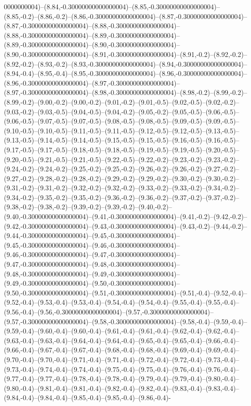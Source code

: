 0000000004)--(8.84,-0.30000000000000004)--(8.85,-0.30000000000000004)--(8.85,-0.2)--(8.86,-0.2)--(8.86,-0.30000000000000004)--(8.87,-0.30000000000000004)--(8.87,-0.30000000000000004)--(8.88,-0.30000000000000004)--(8.88,-0.30000000000000004)--(8.89,-0.30000000000000004)--(8.89,-0.30000000000000004)--(8.90,-0.30000000000000004)--(8.90,-0.30000000000000004)--(8.91,-0.30000000000000004)--(8.91,-0.2)--(8.92,-0.2)--(8.92,-0.2)--(8.93,-0.2)--(8.93,-0.30000000000000004)--(8.94,-0.30000000000000004)--(8.94,-0.4)--(8.95,-0.4)--(8.95,-0.30000000000000004)--(8.96,-0.30000000000000004)--(8.96,-0.30000000000000004)--(8.97,-0.30000000000000004)--(8.97,-0.30000000000000004)--(8.98,-0.30000000000000004)--(8.98,-0.2)--(8.99,-0.2)--(8.99,-0.2)--(9.00,-0.2)--(9.00,-0.2)--(9.01,-0.2)--(9.01,-0.5)--(9.02,-0.5)--(9.02,-0.2)--(9.03,-0.2)--(9.03,-0.5)--(9.04,-0.5)--(9.04,-0.2)--(9.05,-0.2)--(9.05,-0.5)--(9.06,-0.5)--(9.06,-0.5)--(9.07,-0.5)--(9.07,-0.5)--(9.08,-0.5)--(9.08,-0.5)--(9.09,-0.5)--(9.09,-0.5)--(9.10,-0.5)--(9.10,-0.5)--(9.11,-0.5)--(9.11,-0.5)--(9.12,-0.5)--(9.12,-0.5)--(9.13,-0.5)--(9.13,-0.5)--(9.14,-0.5)--(9.14,-0.5)--(9.15,-0.5)--(9.15,-0.5)--(9.16,-0.5)--(9.16,-0.5)--(9.17,-0.5)--(9.17,-0.5)--(9.18,-0.5)--(9.18,-0.5)--(9.19,-0.5)--(9.19,-0.5)--(9.20,-0.5)--(9.20,-0.5)--(9.21,-0.5)--(9.21,-0.5)--(9.22,-0.5)--(9.22,-0.2)--(9.23,-0.2)--(9.23,-0.2)--(9.24,-0.2)--(9.24,-0.2)--(9.25,-0.2)--(9.25,-0.2)--(9.26,-0.2)--(9.26,-0.2)--(9.27,-0.2)--(9.27,-0.2)--(9.28,-0.2)--(9.28,-0.2)--(9.29,-0.2)--(9.29,-0.2)--(9.30,-0.2)--(9.30,-0.2)--(9.31,-0.2)--(9.31,-0.2)--(9.32,-0.2)--(9.32,-0.2)--(9.33,-0.2)--(9.33,-0.2)--(9.34,-0.2)--(9.34,-0.2)--(9.35,-0.2)--(9.35,-0.2)--(9.36,-0.2)--(9.36,-0.2)--(9.37,-0.2)--(9.37,-0.2)--(9.38,-0.2)--(9.38,-0.2)--(9.39,-0.2)--(9.39,-0.2)--(9.40,-0.2)--(9.40,-0.30000000000000004)--(9.41,-0.30000000000000004)--(9.41,-0.2)--(9.42,-0.2)--(9.42,-0.30000000000000004)--(9.43,-0.30000000000000004)--(9.43,-0.2)--(9.44,-0.2)--(9.44,-0.30000000000000004)--(9.45,-0.30000000000000004)--(9.45,-0.30000000000000004)--(9.46,-0.30000000000000004)--(9.46,-0.30000000000000004)--(9.47,-0.30000000000000004)--(9.47,-0.30000000000000004)--(9.48,-0.30000000000000004)--(9.48,-0.30000000000000004)--(9.49,-0.30000000000000004)--(9.49,-0.30000000000000004)--(9.50,-0.30000000000000004)--(9.50,-0.30000000000000004)--(9.51,-0.30000000000000004)--(9.51,-0.4)--(9.52,-0.4)--(9.52,-0.4)--(9.53,-0.4)--(9.53,-0.4)--(9.54,-0.4)--(9.54,-0.4)--(9.55,-0.4)--(9.55,-0.4)--(9.56,-0.4)--(9.56,-0.30000000000000004)--(9.57,-0.30000000000000004)--(9.57,-0.30000000000000004)--(9.58,-0.30000000000000004)--(9.58,-0.4)--(9.59,-0.4)--(9.59,-0.4)--(9.60,-0.4)--(9.60,-0.4)--(9.61,-0.4)--(9.61,-0.4)--(9.62,-0.4)--(9.62,-0.4)--(9.63,-0.4)--(9.63,-0.4)--(9.64,-0.4)--(9.64,-0.4)--(9.65,-0.4)--(9.65,-0.4)--(9.66,-0.4)--(9.66,-0.4)--(9.67,-0.4)--(9.67,-0.4)--(9.68,-0.4)--(9.68,-0.4)--(9.69,-0.4)--(9.69,-0.4)--(9.70,-0.4)--(9.70,-0.4)--(9.71,-0.4)--(9.71,-0.4)--(9.72,-0.4)--(9.72,-0.4)--(9.73,-0.4)--(9.73,-0.4)--(9.74,-0.4)--(9.74,-0.4)--(9.75,-0.4)--(9.75,-0.4)--(9.76,-0.4)--(9.76,-0.4)--(9.77,-0.4)--(9.77,-0.4)--(9.78,-0.4)--(9.78,-0.4)--(9.79,-0.4)--(9.79,-0.4)--(9.80,-0.4)--(9.80,-0.4)--(9.81,-0.4)--(9.81,-0.4)--(9.82,-0.4)--(9.82,-0.4)--(9.83,-0.4)--(9.83,-0.4)--(9.84,-0.4)--(9.84,-0.4)--(9.85,-0.4)--(9.85,-0.4)--(9.86,-0.4)-